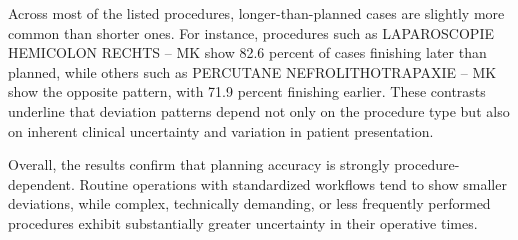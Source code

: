 \documentclass[
]{article}
\begin{document}
Across most of the listed procedures, longer-than-planned cases are
slightly more common than shorter ones. For instance, procedures such as
LAPAROSCOPIE HEMICOLON RECHTS -- MK show 82.6 percent of cases finishing
later than planned, while others such as PERCUTANE NEFROLITHOTRAPAXIE --
MK show the opposite pattern, with 71.9 percent finishing earlier. These
contrasts underline that deviation patterns depend not only on the
procedure type but also on inherent clinical uncertainty and variation
in patient presentation.

Overall, the results confirm that planning accuracy is strongly
procedure-dependent. Routine operations with standardized workflows tend
to show smaller deviations, while complex, technically demanding, or
less frequently performed procedures exhibit substantially greater
uncertainty in their operative times.
\end{document}
